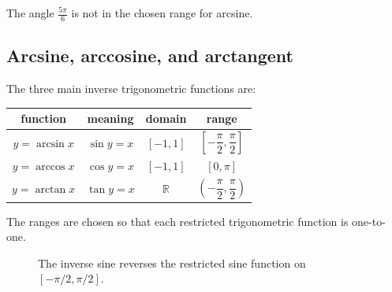 The angle \(\frac{5\pi}{6}\) is not in the chosen range for arcsine.

\subsection{Arcsine, arccosine, and arctangent}
\label{appsubsec:arcsin-arccos-arctan}

The three main inverse trigonometric functions are:

\begin{center}
\renewcommand{\arraystretch}{2.0}
\begin{tabular}{c|c|c|c}
\textbf{function} & \textbf{meaning} & \textbf{domain} & \textbf{range} \\ \hline
\(y=\arcsin x\) &
\(\sin y=x\) &
\([-1,1]\) &
\(\left[-\dfrac{\pi}{2},\dfrac{\pi}{2}\right]\) \\[6pt]

\(y=\arccos x\) &
\(\cos y=x\) &
\([-1,1]\) &
\([0,\pi]\) \\[6pt]

\(y=\arctan x\) &
\(\tan y=x\) &
\(\mathbb R\) &
\(\left(-\dfrac{\pi}{2},\dfrac{\pi}{2}\right)\)
\end{tabular}
\end{center}

The ranges are chosen so that each restricted trigonometric function is one-to-one.

\begin{figure}[h]
\centering
{}
\caption{The inverse sine reverses the restricted sine function on \([-\pi/2,\pi/2]\).}
\label{fig:appendix-arcsin-graph}
\end{figure}

